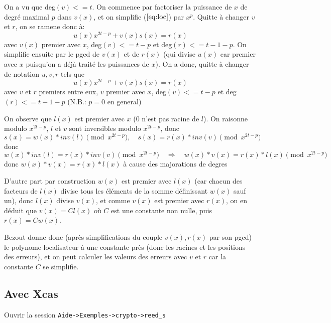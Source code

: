 \documentclass[a4paper,11pt]{book}
\begin{document}
\begin{giacjshere}
On a vu que deg$(v)<=t$.
On commence par factoriser la puissance de $x$ de degr\'e maximal $p$ dans
$v(x)$, et on simplifie (\(\ref{eq:loc}\)) par $x^p$. 
Quitte \`a changer $v$ et $r$, on se
ramene donc \`a:
\[   u(x)  x^{2t-p}+ v(x) s(x) = r(x) \]
avec $v(x)$ premier avec $x$, deg$(v)<= t-p$ et deg$(r)<= t-1-p$.
On simplifie ensuite par le pgcd de $v(x)$ et de $r(x)$
(qui divise $u(x)$ car premier avec $x$ puisqu'on a d\'ej\`a trait\'e les
puissances de $x$).
On a donc, quitte \`a changer de notation $u,v,r$ tels que
\[  u(x)  x^{2t-p}+ v(x) s(x) = r(x) \]
avec $v$ et $r$ premiers entre eux, $v$ premier avec $x$,
deg$(v)<=t-p$ et deg$(r)<=t-1-p$ (N.B.: $p=0$ en general)

On observe que $l(x)$ est premier avec $x$ ($0$ n'est pas racine de $l$).
On raisonne modulo $x^{2t-p}$, $l$ et $v$ sont inversibles modulo $x^{2t-p}$,
donc 
\[ s(x) = w(x)*inv(l) \pmod{ x^{2t-p}},
\quad s(x) = r(x)*inv(v) \pmod {x^{2t-p}} \]
donc 
\[ w(x)*inv(l)=r(x)*inv(v) \pmod{x^{2t-p}} 
\quad \Rightarrow \quad w(x)*v(x)=r(x)*l(x) \pmod {x^{2t-p}} \]
donc $w(x)*v(x)=r(x)*l(x)$ \`a cause des majorations de degres

D'autre part par construction $w(x)$ est premier avec $l(x)$ (car chacun
des facteurs de $l(x)$ divise tous les \'el\'ements de la somme d\'efinissant
$w(x)$ sauf un), donc $l(x)$ divise $v(x)$, et comme $v(x)$ est premier
avec $r(x)$, on en d\'eduit que $v(x)=C l(x)$ o\`u $C$ est une constante non
nulle, puis $r(x) = C w(x)$.

Bezout donne donc (apr\`es simplifications du couple $v(x), r(x)$ par
son pgcd) le polynome localisateur \`a une constante pr\`es (donc les
racines et les positions des erreurs), et on peut calculer
les valeurs des erreurs avec $v$ et $r$ car la constante $C$ se simplifie.

\subsection{Avec Xcas}
Ouvrir la session \verb|Aide->Exemples->crypto->reed_s|


\pagebreak

\end{giacjshere}
\end{document}
